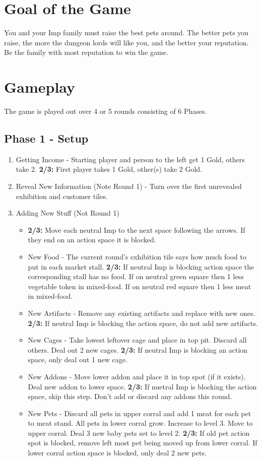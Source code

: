 \documentclass[12pt]{article}
\newenvironment{enumerateCustom}
{\begin{enumerate}
  \setlength{\itemsep}{1pt}
  \setlength{\parskip}{0pt}
  \setlength{\parsep}{0pt}}
{\end{enumerate}}
\newenvironment{itemizeCustom}
{\begin{itemize}
  \setlength{\itemsep}{1pt}
  \setlength{\parskip}{0pt}
  \setlength{\parsep}{0pt}}
{\end{itemize}}
\begin{document}
\begin{mdframed}[style = customFrame]
\begin{multicols*}{2}
\section*{Goal of the Game}
You and your Imp family must raise the best pets around. The better pets you raise, the more the dungeon lords will like you, and the better your reputation. Be the family with most reputation to win the game.

\section*{Gameplay}
The game is played out over 4 or 5 rounds consisting of 6 Phases.

\subsection*{Phase 1 - Setup}
\begin{enumerateCustom}
	\item Getting Income - Starting player and person to the left get 1 Gold, others take 2. \textbf{2/3:} First player takes 1 Gold, other(s) take 2 Gold.
	\item Reveal New Information (Note Round 1) - Turn over the first unrevealed exhibition and customer tiles.
	\item Adding New Stuff (Not Round 1)
		\begin{itemizeCustom}
			\item \textbf{2/3:} Move each neutral Imp to the next space following the arrows. If they end on an action space it is blocked.
			\item New Food - The current round's exhibition tile says how much food to put in each market stall. \textbf{2/3: } If neutral Imp is blocking action space the corresponding stall has no food. If on neutral green square then 1 less vegetable token in mixed-food. If on neutral red square then 1 less meat in mixed-food.
			\item New Artifacts - Remove any existing artifacts and replace with new ones. \textbf{2/3:} If neutral Imp is blocking the action space, do not add new artifacts.
			\item New Cages - Take lowest leftover cage and place in top pit. Discard all others. Deal out 2 new cages. \textbf{2/3:} If neutral Imp is blocking an action space, only deal out 1 new cage.
			\item New Addons - Move lower addon and place it in top spot (if it exists). Deal new addon to lower space. \textbf{2/3:} If nuetral Imp is blocking the action space, skip this step. Don't add or discard any addons this round.
			\item New Pets - Discard all pets in upper corral and add 1 meat for each pet to meat stand. All pets in lower corral grow. Increase to level 3. Move to upper corral. Deal 3 new baby pets set to level 2. \textbf{2/3:} If old pet action spot is blocked, remove left most pet being moved up from lower corral. If lower corral action space is blocked, only deal 2 new pets.
		\end{itemizeCustom}
\end{enumerateCustom}


\end{multicols*}
\end{mdframed}
\end{document}
